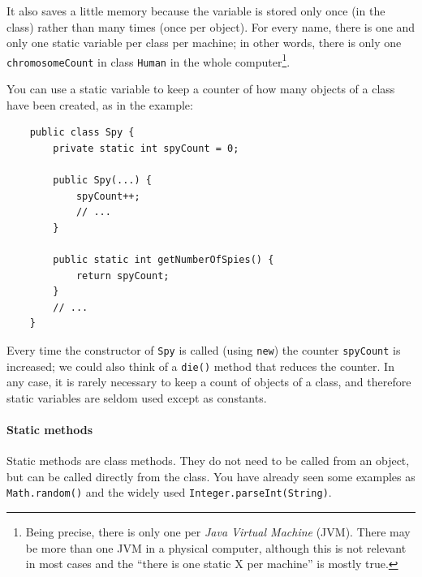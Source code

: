 It also saves a little
memory because 
the variable is stored only once (in the class) rather than many times
(once per object). For every name, there is one and only one static
variable per class per machine; in other words, there is only one
\verb+chromosomeCount+ in class \verb+Human+ in the whole
computer\footnote{Being precise, there is only one per \emph{Java
    Virtual Machine} (JVM). There may be more than one JVM in a
  physical computer, although this is not relevant in most cases and
  the ``there is one static X per machine'' is mostly true.}. 

% 
% 

You can use a static variable to keep a counter of how many objects of
a class have been created, as in the example: 

\begin{verbatim}
    public class Spy {
        private static int spyCount = 0;

        public Spy(...) {
            spyCount++;
            // ...
        }

        public static int getNumberOfSpies() {
            return spyCount;
        }
        // ...
    }
\end{verbatim}

Every time the constructor of \verb+Spy+ is called (using \verb+new+) 
the counter \verb+spyCount+ is
increased; we could also think of a \verb+die()+ method that reduces
the counter. In any case, it is rarely necessary to keep a count of
objects of a class, and therefore static variables are seldom used
except as constants. 

\paragraph{Static methods}
\label{sec:static-methods}

Static methods are class methods. They do not need to be called from
an object, but can be called directly from the class. You have already
seen some examples as \verb+Math.random()+ 
and the widely used \verb+Integer.parseInt(String)+. 

